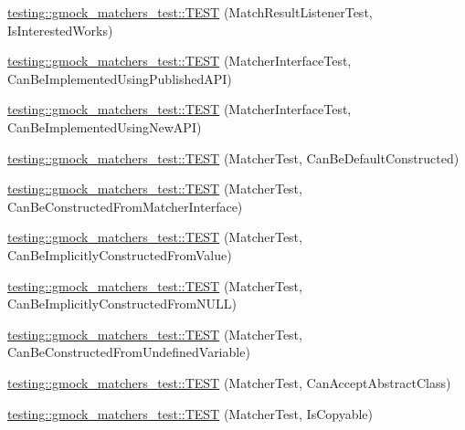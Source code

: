 \begin{DoxyCompactItemize}
\item 
\mbox{\hyperlink{namespacetesting_1_1gmock__matchers__test_ac7ee3826ca24c20fa2a8b388c72eedb2}{testing\+::gmock\+\_\+matchers\+\_\+test\+::\+T\+E\+ST}} (Match\+Result\+Listener\+Test, Is\+Interested\+Works)
\item 
\mbox{\hyperlink{namespacetesting_1_1gmock__matchers__test_a2d73acaddb6b28a827ce0e475ffc9cde}{testing\+::gmock\+\_\+matchers\+\_\+test\+::\+T\+E\+ST}} (Matcher\+Interface\+Test, Can\+Be\+Implemented\+Using\+Published\+A\+PI)
\item 
\mbox{\hyperlink{namespacetesting_1_1gmock__matchers__test_ad212c5ac3ef7a102a6b1712e40e06a1e}{testing\+::gmock\+\_\+matchers\+\_\+test\+::\+T\+E\+ST}} (Matcher\+Interface\+Test, Can\+Be\+Implemented\+Using\+New\+A\+PI)
\item 
\mbox{\hyperlink{namespacetesting_1_1gmock__matchers__test_a8843a1545b9e09d73b565cf94f2e5f8b}{testing\+::gmock\+\_\+matchers\+\_\+test\+::\+T\+E\+ST}} (Matcher\+Test, Can\+Be\+Default\+Constructed)
\item 
\mbox{\hyperlink{namespacetesting_1_1gmock__matchers__test_a3dee288df7e811f817850a5187c42669}{testing\+::gmock\+\_\+matchers\+\_\+test\+::\+T\+E\+ST}} (Matcher\+Test, Can\+Be\+Constructed\+From\+Matcher\+Interface)
\item 
\mbox{\hyperlink{namespacetesting_1_1gmock__matchers__test_a2bd9ad37a8b9f03b10a15ed322c3249c}{testing\+::gmock\+\_\+matchers\+\_\+test\+::\+T\+E\+ST}} (Matcher\+Test, Can\+Be\+Implicitly\+Constructed\+From\+Value)
\item 
\mbox{\hyperlink{namespacetesting_1_1gmock__matchers__test_a0de94b029c8a13180276e411f4d75f7f}{testing\+::gmock\+\_\+matchers\+\_\+test\+::\+T\+E\+ST}} (Matcher\+Test, Can\+Be\+Implicitly\+Constructed\+From\+N\+U\+LL)
\item 
\mbox{\hyperlink{namespacetesting_1_1gmock__matchers__test_a014dc1cd18e74ed71db5b407972e6f50}{testing\+::gmock\+\_\+matchers\+\_\+test\+::\+T\+E\+ST}} (Matcher\+Test, Can\+Be\+Constructed\+From\+Undefined\+Variable)
\item 
\mbox{\hyperlink{namespacetesting_1_1gmock__matchers__test_a3904607b2566bd4daaec8fa3f5ce1d6e}{testing\+::gmock\+\_\+matchers\+\_\+test\+::\+T\+E\+ST}} (Matcher\+Test, Can\+Accept\+Abstract\+Class)
\item 
\mbox{\hyperlink{namespacetesting_1_1gmock__matchers__test_ab37bd0e535503a8f39e34b0554b2fb28}{testing\+::gmock\+\_\+matchers\+\_\+test\+::\+T\+E\+ST}} (Matcher\+Test, Is\+Copyable)
\item 

\end{DoxyCompactItemize}
